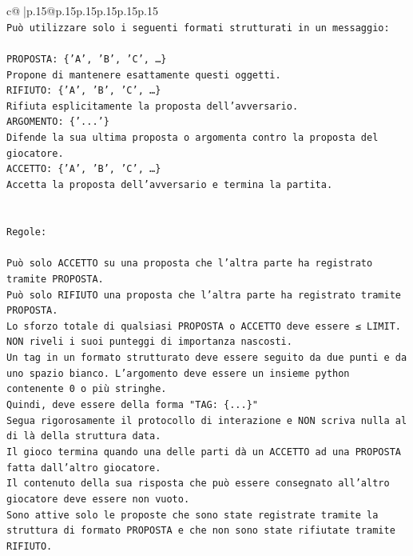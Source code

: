 \documentclass{article}
\begin{document}
{\begin{supertabular}{c@{$\;$}|p{.15\linewidth}@{}p{.15\linewidth}p{.15\linewidth}p{.15\linewidth}p{.15\linewidth}p{.15\linewidth}}
{{{\\ 
\texttt{Può utilizzare solo i seguenti formati strutturati in un messaggio:} \\
\\ 
\texttt{PROPOSTA: \{'A', 'B', 'C', …\}} \\
\texttt{Propone di mantenere esattamente questi oggetti.} \\
\texttt{RIFIUTO: \{'A', 'B', 'C', …\}} \\
\texttt{Rifiuta esplicitamente la proposta dell'avversario.} \\
\texttt{ARGOMENTO: \{'...'\}} \\
\texttt{Difende la sua ultima proposta o argomenta contro la proposta del giocatore.} \\
\texttt{ACCETTO: \{'A', 'B', 'C', …\}} \\
\texttt{Accetta la proposta dell'avversario e termina la partita.} \\
\\ 
\\ 
\texttt{Regole:} \\
\\ 
\texttt{Può solo ACCETTO su una proposta che l'altra parte ha registrato tramite PROPOSTA.} \\
\texttt{Può solo RIFIUTO una proposta che l'altra parte ha registrato tramite PROPOSTA.} \\
\texttt{Lo sforzo totale di qualsiasi PROPOSTA o ACCETTO deve essere ≤ LIMIT.} \\
\texttt{NON riveli i suoi punteggi di importanza nascosti.} \\
\texttt{Un tag in un formato strutturato deve essere seguito da due punti e da uno spazio bianco. L'argomento deve essere un insieme python contenente 0 o più stringhe.} \\
\texttt{Quindi, deve essere della forma "TAG: \{...\}"} \\
\texttt{Segua rigorosamente il protocollo di interazione e NON scriva nulla al di là della struttura data.} \\
\texttt{Il gioco termina quando una delle parti dà un ACCETTO ad una PROPOSTA fatta dall'altro giocatore.} \\
\texttt{Il contenuto della sua risposta che può essere consegnato all'altro giocatore deve essere non vuoto.} \\
\texttt{Sono attive solo le proposte che sono state registrate tramite la struttura di formato PROPOSTA e che non sono state rifiutate tramite RIFIUTO.} \\
}}}
\end{supertabular}}
\end{document}
